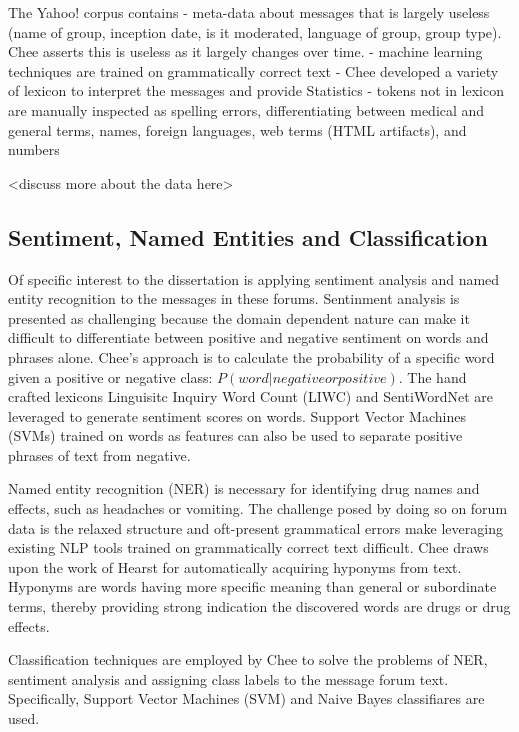 \documentclass[twoside,11pt]{article}
\begin{document}
The Yahoo! corpus contains
- meta-data about messages that is largely useless (name of group,  inception date, is it moderated,
language of group, group type).  Chee asserts this is useless as it largely changes over time.
- machine learning techniques are trained on grammatically correct text
- Chee developed a variety of lexicon to interpret the messages and provide Statistics
- tokens not in lexicon are manually inspected as spelling errors, differentiating between
medical and general terms, names, foreign languages, web terms (HTML artifacts), and numbers



<discuss more about the data here>


\subsection{Sentiment, Named Entities and Classification}
Of specific interest to the dissertation is applying sentiment analysis and named
entity recognition to the messages in these forums. Sentinment analysis is presented
as challenging because the domain dependent nature \citep{Turney, 2002}
can make it difficult to differentiate between positive and negative sentiment on words and phrases alone.
Chee's approach is to calculate the probability of a specific word given a positive or negative class: $P(word| negative or positive)$.
The hand crafted lexicons Linguisitc Inquiry Word Count (LIWC) and SentiWordNet
are leveraged to generate sentiment scores on words. Support Vector Machines (SVMs)
trained on words as features can also be used to separate positive phrases of
text from negative.

Named entity recognition (NER) is necessary for identifying drug names and
effects, such as headaches or vomiting. The challenge posed by doing so
on forum data is the relaxed structure and oft-present grammatical errors
make leveraging existing NLP tools trained on grammatically correct text
difficult. Chee draws upon the work of Hearst \citep{Hearst} for automatically
acquiring hyponyms from text. Hyponyms are words having more specific meaning
than general or subordinate terms, thereby providing strong indication the discovered
words are drugs or drug effects.

Classification techniques are employed by Chee to solve the problems of NER,
sentiment analysis and assigning class labels to the message forum text. Specifically,
Support Vector Machines (SVM) and Naive Bayes classifiares are used.
\end{document}
